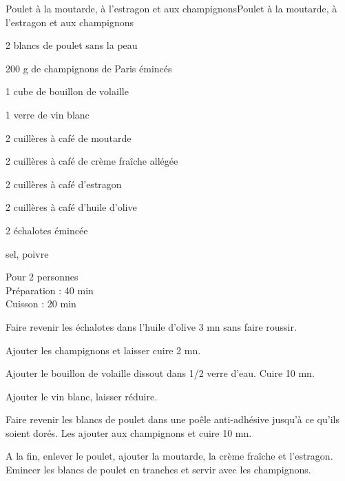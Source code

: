 \begin{recette}{Poulet à la moutarde, à l'estragon et aux champignons}{Poulet à la moutarde, à l'estragon et aux champignons}

\begin{ingredients}
2 blancs de poulet sans la peau\par
200 g de champignons de Paris émincés\par
1 cube de bouillon de volaille\par
1 verre de vin blanc\par
2 cuillères à café de moutarde\par
2 cuillères à café de crème fraîche allégée\par
2 cuillères à café d'estragon\par
2 cuillères à café d'huile d'olive\par
2 échalotes émincée\par
sel, poivre\par
\end{ingredients}

\begin{infos}
Pour 2 personnes\\
Préparation : 40 min\\
Cuisson : 20 min\\
\end{infos}

\begin{etapes}
\item Faire revenir les échalotes dans l'huile d'olive 3 mn sans faire roussir.
\item Ajouter les champignons et laisser cuire 2 mn.
\item Ajouter le bouillon de volaille dissout dans 1/2 verre d'eau. Cuire 10 mn.
\item Ajouter le vin blanc, laisser réduire.
\item Faire revenir les blancs de poulet dans une poêle anti-adhésive jusqu'à ce qu'ils soient dorés. Les ajouter aux champignons et cuire 10 mn.
\item A la fin, enlever le poulet, ajouter la moutarde, la crème fraîche et l'estragon. Emincer les blancs de poulet en tranches et servir avec les champignons.
\end{etapes}

\end{recette}